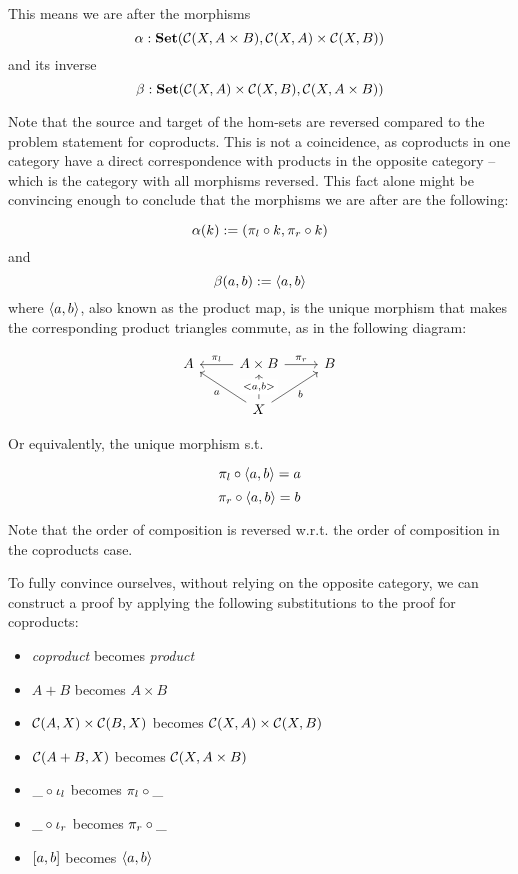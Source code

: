 \begin{solution}\label{sol:product-represent}
\newcommand{\CP}{\CC(A+B,X)}
\newcommand{\CQ}{\CC(A,X)\times\CC(B,X)}
\newcommand{\PP}{\CC(X,A\times B)}
\newcommand{\PQ}{\CC(X,A)\times\CC(X,B)}
	
This means we are after the morphisms \[\alpha:\SET(\PP, \PQ)\] and its inverse \[\beta:\SET(\PQ, \PP)\]

Note that the source and target of the hom-sets are reversed compared to the problem statement for coproducts. This is not a coincidence, as coproducts in one category have a direct correspondence with products in the opposite category -- which is the category with all morphisms reversed. This fact alone might be convincing enough to conclude that the morphisms we are after are the following:

\[\alpha(k):=(\pi_l \circ k, \pi_r \circ k)\] and \[\beta(a,b) := \langle a, b \rangle\] where $\langle a, b \rangle$, also known as the product map, is the unique morphism that makes the corresponding product triangles commute, as in the following diagram:

\[
\begin{tikzcd}
A & A\times B \arrow[r, "\pi_r"] \arrow[l, "\pi_l"']                    & B \\
	& X \arrow[u, "{<a,b>}" description] \arrow[ru, "b"'] \arrow[lu, "a"] &  
\end{tikzcd}
\]

Or equivalently, the unique morphism s.t. 

\begin{equation}
\label{ga2}
	\pi_l \circ \langle a, b \rangle = a
\end{equation}
\begin{equation}
\label{gb2}
	\pi_r \circ \langle a, b \rangle = b
\end{equation}

Note that the order of composition is reversed w.r.t. the order of composition in the coproducts case.

To fully convince ourselves, without relying on the opposite category, we can construct a proof by applying the following substitutions to the proof for coproducts:

\begin{itemize}
	\item \textit{coproduct} becomes \textit{product}
	\item $A+B$ becomes $A\times B$
	\item $\CQ$ becomes $\PQ$
	\item $\CP$ becomes $\PP$
	\item $\_ \circ \iota_l$ becomes $\pi_l \circ \_$
	\item $\_ \circ \iota_r$ becomes $\pi_r \circ \_$
	\item $[ a, b ]$ becomes $\langle a, b \rangle$
\end{itemize}
\end{solution}

